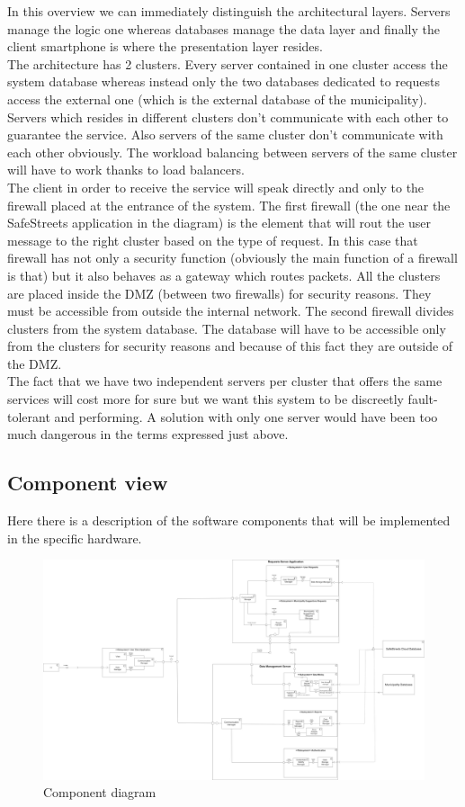 \documentclass[titlepage]{article}
\begin{document}
In this overview we can immediately distinguish the architectural layers. Servers manage the logic one whereas databases manage the data layer and finally the client smartphone is where the presentation layer resides. \\
The architecture has 2 clusters. Every server contained in one cluster access the system database whereas instead only the two databases dedicated to requests access the external one (which is the external database of the municipality). Servers which resides in different clusters don't communicate with each other to guarantee the service. Also servers of the same cluster don't communicate with each other obviously. The workload balancing between servers of the same cluster will have to work thanks to load balancers.\\
The client in order to receive the service will speak directly and only to the firewall placed at the entrance of the system. The first firewall (the one near the SafeStreets application in the diagram) is the element that will rout the user message to the right cluster based on the type of request. In this case that firewall has not only a security function (obviously the main function of a firewall is that) but it also behaves as a gateway which routes packets. All the clusters are placed inside the DMZ (between two firewalls) for security reasons. They must be accessible from outside the internal network. The second firewall divides clusters from the system database. The database will have to be accessible only from the clusters for security reasons and because of this fact they are outside of the DMZ.\\
The fact that we have two independent servers per cluster that offers the same services will cost more for sure but we want this system to be discreetly fault-tolerant and performing. A solution with only one server would have been too much dangerous in the terms expressed just above.
\subsection{Component view}
Here there is a description of the software components that will be implemented in the specific hardware.

\begin{figure}[h]
	\includegraphics[scale=0.1]{Diagrams/Component diagram.png}
	\caption{Component diagram}
\end{figure}
\FloatBarrier
\end{document}
